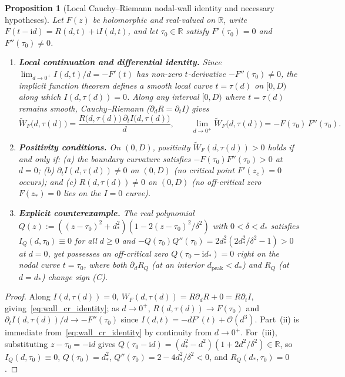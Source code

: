 \documentclass[11pt,reqno]{amsart}
\theoremstyle{plain}
\newtheorem{proposition}[theorem]{Proposition}
\theoremstyle{definition}
\theoremstyle{remark}
\numberwithin{equation}{section}
\newcommand{\ii}{\mathrm{i}}
\begin{document}
\begin{proposition}[Local Cauchy--Riemann nodal-wall identity and necessary hypotheses]\label{prop:nodal_wall}
Let $F(z)$ be holomorphic and real-valued on $\mathbb{R}$, write $F(t - \ii d) = R(d,t) + \ii I(d,t)$, and let $\tau_0 \in \mathbb{R}$ satisfy $F'(\tau_0) = 0$ and $F''(\tau_0) \neq 0$.
\begin{enumerate}[label=\textup{(\roman*)},leftmargin=2.2em]
\item \textbf{Local continuation and differential identity.} Since $\lim_{d\to 0^+} I(d,t)/d = -F'(t)$ has non-zero $t$-derivative $-F''(\tau_0) \neq 0$, the implicit function theorem defines a smooth local curve $t = \tau(d)$ on $[0, D)$ along which $I(d,\tau(d)) = 0$. Along any interval $[0, D)$ where $t = \tau(d)$ remains smooth, Cauchy--Riemann ($\partial_d R = \partial_t I$) gives
\begin{equation}\label{eq:wall_cr_identity}
\widetilde{W}_F\bigl(d, \tau(d)\bigr) = \frac{R\bigl(d,\tau(d)\bigr)\,\partial_t I\bigl(d,\tau(d)\bigr)}{d}, \qquad \lim_{d\to 0^+} \widetilde{W}_F\bigl(d, \tau(d)\bigr) = -F(\tau_0)\,F''(\tau_0).
\end{equation}
\item \textbf{Positivity conditions.} On $(0, D)$, positivity $\widetilde{W}_F(d,\tau(d)) > 0$ holds if and only if: \textup{(a)} the boundary curvature satisfies $-F(\tau_0)F''(\tau_0) > 0$ at $d = 0$; \textup{(b)} $\partial_t I(d,\tau(d)) \neq 0$ on $(0, D)$ (no critical point $F'(z_c) = 0$ occurs); \emph{and} \textup{(c)} $R(d,\tau(d)) \neq 0$ on $(0, D)$ (no off-critical zero $F(z_*) = 0$ lies on the $I = 0$ curve).
\item \textbf{Explicit counterexample.} The real polynomial $Q(z) := ((z - \tau_0)^2 + d_*^2)(1 - 2(z - \tau_0)^2/\delta^2)$ with $0 < \delta < d_*$ satisfies $I_Q(d, \tau_0) \equiv 0$ for all $d \ge 0$ and $-Q(\tau_0)Q''(\tau_0) = 2d_*^2(2d_*^2/\delta^2 - 1) > 0$ at $d = 0$, yet possesses an off-critical zero $Q(\tau_0 - \ii d_*) = 0$ right on the nodal curve $t = \tau_0$, where both $\partial_d R_Q$ (at an interior $d_{\mathrm{peak}} < d_*$) and $R_Q$ (at $d = d_*$) change sign (C).
\end{enumerate}
\end{proposition}

\begin{proof}
Along $I(d,\tau(d)) = 0$, $W_F(d,\tau(d)) = R\partial_d R + 0 = R\partial_t I$, giving~\eqref{eq:wall_cr_identity}; as $d \to 0^+$, $R(d,\tau(d)) \to F(\tau_0)$ and $\partial_t I(d,\tau(d))/d \to -F''(\tau_0)$ since $I(d,t) = -d F'(t) + \mathcal{O}(d^3)$. Part~(ii) is immediate from~\eqref{eq:wall_cr_identity} by continuity from $d \to 0^+$. For~(iii), substituting $z - \tau_0 = -\ii d$ gives $Q(\tau_0 - \ii d) = (d_*^2 - d^2)(1 + 2d^2/\delta^2) \in \mathbb{R}$, so $I_Q(d,\tau_0) \equiv 0$, $Q(\tau_0) = d_*^2$, $Q''(\tau_0) = 2 - 4d_*^2/\delta^2 < 0$, and $R_Q(d_*, \tau_0) = 0$.
\end{proof}
\end{document}
